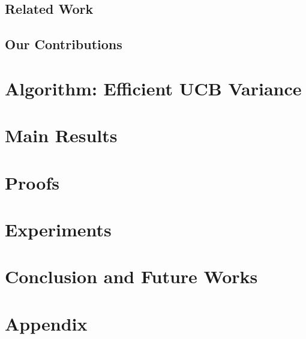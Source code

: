 \documentclass[letterpaper]{article} %
\begin{document}
\subsection{Related Work}
\label{sec:related}



\subsection{Our Contributions}
\label{sec:contri}


\section{Algorithm: Efficient UCB Variance}
\label{sec:eucbv}


\section{Main Results} 
\label{sec:results}


\section{Proofs}
\label{sec:proofTheorem}


\section{Experiments}
\label{sec:expt}


\section{Conclusion and Future Works}
\label{sec:conc}



\clearpage
\newpage





\clearpage
\newpage


\section{Appendix}
\label{sec:app}

\end{document}
